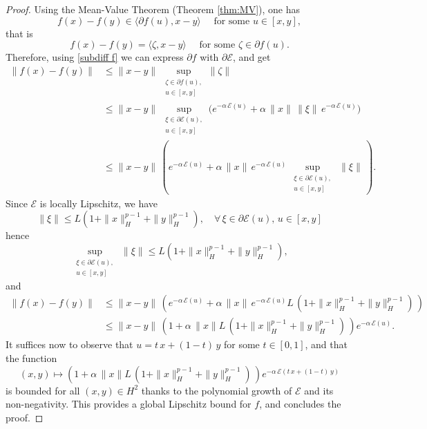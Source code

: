 \documentclass[12pt]{amsart}
\numberwithin{equation}{section}
\begin{document}
\begin{proof}
Using the Mean-Value Theorem (Theorem \ref{thm:MV}), one has
\begin{equation*}
    f(x) - f(y)  \in \langle \partial f(u), x-y \rangle \quad \text{ for some } u\in [x,y],
\end{equation*}
that is
\begin{equation*}
    f(x) - f(y)  = \langle \zeta, x-y \rangle \quad \text{ for some } \zeta \in \partial f(u).
\end{equation*}
Therefore, using \eqref{subdiff f} we can express $\partial f$ with $\partial \mathscr{E}$, and get 
\begin{align*}
    \|f(x) - f(y)\| & \leq \|x-y\|\,\sup\limits_{\substack{\zeta \in \partial f(u),\\ u\in [x,y]}} \|\zeta\|\\
    & \leq \|x-y\|\,\sup\limits_{\substack{\xi \in \partial \mathscr{E}(u),\\ u\in [x,y]}} \bigg(e^{-\alpha\,\mathscr{E}(u)} + \alpha\,\|x\|\,\|\xi\|\,e^{-\alpha\,\mathscr{E}(u)}\bigg)\\
    & \leq \|x-y\|\, \left(e^{-\alpha\,\mathscr{E}(u)} + \alpha\,\|x\|\,e^{-\alpha\,\mathscr{E}(u)}\,\sup\limits_{\substack{\xi \in \partial \mathscr{E}(u),\\ u\in [x,y]}}\,\|\xi\|\,\right).
\end{align*}
Since $\mathscr{E}$ is locally Lipschitz, we have
\begin{equation*}
    \|\xi\| \leq L(1+\|x\|_H^{p-1}+\|y\|_H^{p-1}),\quad \forall \, \xi \in \partial \mathscr{E}(u),\, u\in [x,y]
\end{equation*}
hence
\begin{equation*}
    \sup\limits_{\substack{\xi \in \partial \mathscr{E}(u),\\ u\in [x,y]}}\,\|\xi\| \leq L(1+\|x\|_H^{p-1}+\|y\|_H^{p-1}),
\end{equation*}
and
\begin{equation*}
\begin{aligned}
    \|f(x) - f(y)\| & \leq \|x-y\|\, \left(e^{-\alpha\,\mathscr{E}(u)} + \alpha\,\|x\|\,e^{-\alpha\,\mathscr{E}(u)}L\,(1+\|x\|_H^{p-1}+\|y\|_H^{p-1})\,\right)\\
    & \leq \|x-y\|\, \left(1 + \alpha\,\|x\|L\,(1+\|x\|_H^{p-1}+\|y\|_H^{p-1})\,\right)e^{-\alpha\,\mathscr{E}(u)}.
\end{aligned}
\end{equation*}
It suffices now to observe that $u=t\,x+(1-t)\,y$ for some $t\in [0,1]$, and that the function 
\begin{equation*}
    (x,y)\mapsto \left(1 + \alpha\,\|x\|L\,(1+\|x\|_H^{p-1}+\|y\|_H^{p-1})\,\right)e^{-\alpha\,\mathscr{E}(t\,x + (1-t)\,y)}
\end{equation*}
is bounded for all $(x,y)\in H^{2}$ thanks to the polynomial growth of $\mathscr{E}$ and its non-negativity. This provides a global Lipschitz bound for $f$, and concludes the proof. 
\end{proof}
\end{document}
